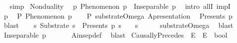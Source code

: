 \begin{isabellebody}
\isadelimproof
\ %
\endisadelimproof
%
\isatagproof
{}\isamarkupfalse%
\ simp%
\endisatagproof
{\isafoldproof}%
%
\isadelimproof
%
\endisadelimproof
%
\isadelimdocument
%
\endisadelimdocument
%
\isatagdocument
%
\isamarkuptrue%
%
\endisatagdocument
{\isafolddocument}%
%
\isadelimdocument
%
\endisadelimdocument
{}\isamarkupfalse%
\ Nonduality{\isacharcolon}{\kern0pt}\isanewline
\ \ {\isachardoublequoteopen}{\isasymforall}p{\isachardot}{\kern0pt}\ Phenomenon\ p\ {\isasymlongrightarrow}\ Inseparable\ p\ {\isasymOmega}{\isachardoublequoteclose}\isanewline
%
\isadelimproof
%
\endisadelimproof
%
\isatagproof
{}\isamarkupfalse%
\ {\isacharparenleft}{\kern0pt}intro\ allI\ impI{\isacharparenright}{\kern0pt}\isanewline
\ \ \isamarkupfalse%
\ p\ \isamarkupfalse%
\ P{\isacharcolon}{\kern0pt}\ {\isachardoublequoteopen}Phenomenon\ p{\isachardoublequoteclose}\isanewline
\ \ \isamarkupfalse%
\ P\ substrate{\isacharunderscore}{\kern0pt}Omega\ A{}{\isacharunderscore}{\kern0pt}presentation\ \isamarkupfalse%
\ {\isachardoublequoteopen}Presents\ p\ {\isasymOmega}{\isachardoublequoteclose}\ \isamarkupfalse%
\ blast\isanewline
\ \ \isamarkupfalse%
\ {\isachardoublequoteopen}{\isasymexists}s{\isachardot}{\kern0pt}\ Substrate\ s\ {\isasymand}\ Presents\ p\ s\ {\isasymand}\ {\isasymOmega}\ {\isacharequal}{\kern0pt}\ s{\isachardoublequoteclose}\isanewline
\ \ \ \ \isamarkupfalse%
\ substrate{\isacharunderscore}{\kern0pt}Omega\ \isamarkupfalse%
\ blast\isanewline
\ \ \isamarkupfalse%
\ {\isachardoublequoteopen}Inseparable\ p\ {\isasymOmega}{\isachardoublequoteclose}\isanewline
\ \ \ \ \isamarkupfalse%
\ A{}{\isacharunderscore}{\kern0pt}insep{\isacharunderscore}{\kern0pt}def\ \isamarkupfalse%
\ blast\isanewline
{}\isamarkupfalse%
%
\endisatagproof
{\isafoldproof}%
%
\isadelimproof
%
\endisadelimproof
%
\isadelimdocument
%
\endisadelimdocument
%
\isatagdocument
%
\isamarkuptrue%
%
\endisatagdocument
{\isafolddocument}%
%
\isadelimdocument
%
\endisadelimdocument
{}\isamarkupfalse%
\ CausallyPrecedes\ {\isacharcolon}{\kern0pt}{\isacharcolon}{\kern0pt}\ {\isachardoublequoteopen}E\ {\isasymRightarrow}\ E\ {\isasymRightarrow}\ bool{\isachardoublequoteclose}\ \ \ \isanewline

\end{isabellebody}
